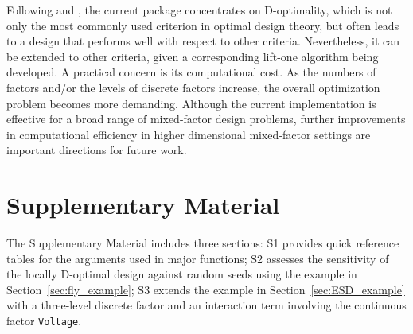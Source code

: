 Following \cite{huang2024forlion} and \cite{lin2025ew}, the current  package concentrates on D-optimality, which is not only the most commonly used criterion in optimal design theory, but often leads to a design that performs well with respect to other criteria. Nevertheless, it can be extended to other criteria, given a corresponding lift-one algorithm being developed. A practical concern is its computational cost. As the numbers of factors and/or the levels of discrete factors increase, the overall optimization problem becomes more demanding. Although the current implementation is effective for a broad range of mixed-factor design problems, further improvements in computational efficiency in higher dimensional mixed-factor settings are important directions for future work.

\section*{Supplementary Material}

The Supplementary Material includes three sections: S1 provides quick reference tables for the arguments used in major  functions; S2 assesses the sensitivity of the locally D-optimal design against random seeds using the example in Section~\ref{sec:fly_example}; S3 extends the example in Section~\ref{sec:ESD_example} with a three-level discrete factor and an interaction term involving the continuous factor \texttt{Voltage}.



\address{Siting Lin\\
  Department of Mathematics, Statistics, and Computer Science\\
  University of Illinois at Chicago\\
  }

\address{Yifei Huang\\
  Astellas Pharma Global Development, Inc.\\
  }

\address{Jie Yang\\
  Department of Mathematics, Statistics, and Computer Science\\
  University of Illinois at Chicago\\
  ORCiD: 0000-0002-9034-4223\\
  }
